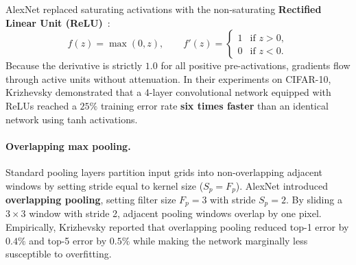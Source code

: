 AlexNet replaced saturating activations with the non-saturating \textbf{Rectified Linear Unit (ReLU)}~\cite{nair2010rectified}:
\begin{equation}
f(z) = \max(0, z), \qquad f'(z) = \begin{cases} 1 & \text{if } z > 0, \\ 0 & \text{if } z < 0. \end{cases}
\label{eq:relu_alexnet_def}
\end{equation}
Because the derivative is strictly $1.0$ for all positive pre-activations, gradients flow through active units without attenuation. In their experiments on CIFAR-10, Krizhevsky demonstrated that a 4-layer convolutional network equipped with ReLUs reached a $25\%$ training error rate \textbf{six times faster} than an identical network using tanh activations.

\paragraph{Overlapping max pooling.}
Standard pooling layers partition input grids into non-overlapping adjacent windows by setting stride equal to kernel size ($S_p = F_p$). AlexNet introduced \textbf{overlapping pooling}, setting filter size $F_p = 3$ with stride $S_p = 2$. By sliding a $3 \times 3$ window with stride 2, adjacent pooling windows overlap by one pixel. Empirically, Krizhevsky reported that overlapping pooling reduced top-1 error by $0.4\%$ and top-5 error by $0.5\%$ while making the network marginally less susceptible to overfitting.

